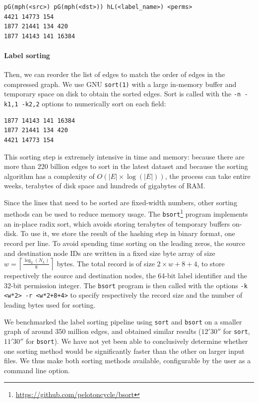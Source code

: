 \begin{verbatim}
pG(mph(<src>) pG(mph(<dst>)) hL(<label_name>) <perms>
4421 14773 154
1877 21441 134 420
1877 14143 141 16384
\end{verbatim}

\paragraph{Label sorting}
Then, we can reorder the list of edges to match the order of edges in the
compressed graph.
We use GNU \texttt{sort(1)} with a large in-memory buffer and temporary
space on disk to obtain the sorted edges. Sort is called with the \texttt{-n
-k1,1 -k2,2} options to numerically sort on each field:

\begin{verbatim}
1877 14143 141 16384
1877 21441 134 420
4421 14773 154
\end{verbatim}

This sorting step is extremely intensive in time and memory: because there are
more than 220 billion edges to sort in the latest dataset and because the
sorting algorithm has a complexity of $O(|E| \times \log(|E|))$, the process
can take entire weeks, terabytes of disk space and hundreds of gigabytes of
RAM.

Since the lines that need to be sorted are fixed-width numbers, other
sorting methods can be used to reduce memory usage. The
\texttt{bsort}\footnote{\url{https://github.com/pelotoncycle/bsort}} program
implements an in-place radix sort, which avoids storing terabytes of temporary
buffers on-disk. To use it, we store the result of the hashing step in binary
format, one record per line. To avoid spending time sorting on the leading
zeros, the source and destination node IDs are written in a fixed size byte
array of size $w = \left\lceil{\frac{\log_2(N_L)}{8}}\right\rceil$ bytes. The
total record is of size $2 \times w + 8 + 4$, to store respectively the source
and destination nodes, the 64-bit label identifier and the 32-bit permission
integer. The \texttt{bsort} program is then called with the options \texttt{-k
<w*2> -r <w*2+8+4>} to specify respectively the record size and the number of
leading bytes used for sorting.

We benchmarked the label sorting pipeline using \texttt{sort} and
\texttt{bsort} on a smaller graph of around 350 million edges, and obtained
similar results ($12'30''$ for \texttt{sort}, $11'30''$ for \texttt{bsort}).
We have not yet been able to conclusively determine whether one sorting method
would be significantly faster than the other on larger input files. We thus
make both sorting methods available, configurable by the user as a command line
option.

